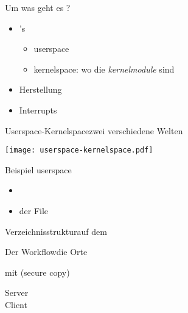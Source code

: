 \documentclass{beamer}
\newcommand{\kernelmodule}{{\em kernelmodule}\xspace}
\begin{document}
\begin{frame}{Um was geht es ?}
 \begin{itemize}
  \item \linux \kernelmodule's
  \begin{itemize}
   \item userspace
   \item kernelspace: wo die \kernelmodule sind
  \end{itemize}
  \item Herstellung
  \item Interrupts
 \end{itemize}
\end{frame}

\begin{frame}{Userspace-Kernelspace}{zwei verschiedene Welten}
 \begin{center}
 \texttt{[image: userspace-kernelspace.pdf]}
 \end{center}
\end{frame}

\begin{frame}{}{Beispiel userspace}
 \begin{itemize}
  \item {}
  \item der File 
 \end{itemize}
\end{frame}

\begin{frame}{Verzeichnisstruktur}{auf dem \host}
\end{frame}

\begin{frame}{Der Workflow}{die Orte}
 \vspace{-2mm}
 \begin{description}[\target]
  \item[\host] 
  \item[\target]
  \item[Verbindung] mit  (secure copy)
   \begin{description}
   \item[Server]  \target
   \item[Client] \host
  \end{description}
 \end{description}
\end{frame}
\end{document}
